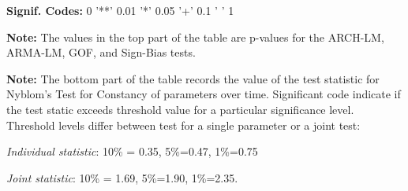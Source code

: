 \begin{table}
\begin{threeparttable}
\begin{tabular}[c]{l l l l l c l l l}
	\hline \hline
		\end{tabular}
		\begin{tablenotes}
			\item{\footnotesize \textbf{Signif. Codes:} 0 '**' 0.01 '*' 0.05 '+' 0.1 ' ' 1}
			\item{\footnotesize \textbf{Note:} The values in the top part of the table are p-values for the ARCH-LM, ARMA-LM, GOF, and Sign-Bias tests.}
			\item{\footnotesize \textbf{Note:} The bottom part of the table records the value of the test statistic for Nyblom's Test for Constancy of parameters over time. Significant code indicate if the test static exceeds threshold value for a particular significance level. Threshold levels differ between test for a single parameter or a joint test:}
			\item{\footnotesize \textit{Individual statistic}: 10\% = 0.35, 5\%=0.47, 1\%=0.75}
			\item{\footnotesize \textit{     Joint statistic}: 10\% = 1.69, 5\%=1.90, 1\%=2.35.}
		\end{tablenotes}
	\end{threeparttable}

\end{table}


